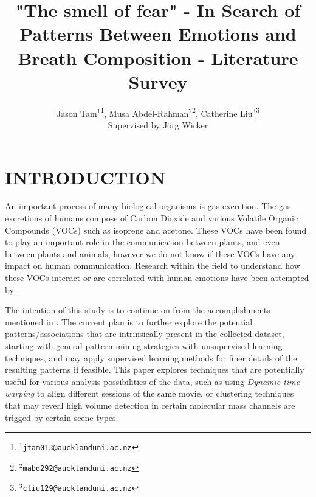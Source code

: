\documentclass[letterpaper, 10 pt, conference]{ieeeconf}  %
\title{\LARGE \bf
"The smell of fear" - In Search of Patterns Between Emotions and Breath Composition - Literature Survey
}
\author{Jason Tam$^{1}$\thanks{{\tt\small $^{1}$jtam013@aucklanduni.ac.nz}}, Musa Abdel-Rahman$^{2}$\thanks{{\tt\small $^{2}$mabd292@aucklanduni.ac.nz}}, Catherine Liu$^{3}$\thanks{{\tt\small $^{3}$cliu129@aucklanduni.ac.nz}}\\Supervised by J{\"o}rg Wicker}
\begin{document}
\maketitle
\thispagestyle{empty}
\pagestyle{empty}






\section{INTRODUCTION}

An important process of many biological organisms is gas excretion. The gas excretions of humans compose of Carbon Dioxide and various Volatile Organic Compounds (VOCs) such as isoprene and acetone. These VOCs have been found to play an important role in the communication between plants, and even between plants and animals, however we do not know if these VOCs have any impact on human communication. Research within the field to understand how these VOCs interact or are correlated with human emotions have been attempted by \cite{NATURE}.

The intention of this study is to continue on from the accomplishments mentioned in \cite{NATURE}. The current plan is to further explore the potential patterns/associations that are intrinsically present in the collected dataset, starting with general pattern mining strategies with unsupervised learning techniques, and may apply supervised learning methods for finer details of the resulting patterns if feasible. This paper explores techniques that are potentially useful for various analysis possibilities of the data, such as using \textit{Dynamic time warping} to align different sessions of the same movie, or clustering techniques that may reveal high volume detection in certain molecular mass channels are trigged by certain scene types.

\end{document}
